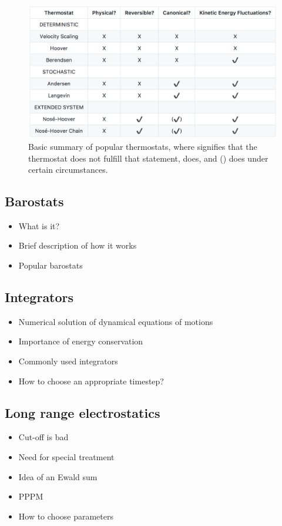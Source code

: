 \documentclass[9pt,bestpractices]{livecoms}
\begin{document}
\begin{figure}[h]
\centering
\includegraphics[width=\linewidth]{thermostat_summary.pdf}
    \caption{Basic summary of popular thermostats, where  signifies
    that the thermostat does not fulfill that statement,  does, and
    () does under certain circumstances.}
\label{tstat_summary}
\end{figure}

\subsection{Barostats}
\begin{itemize}
\item What is it?
\item Brief description of how it works
\item Popular barostats
\end{itemize}

\subsection{Integrators}
\begin{itemize}
\item Numerical solution of dynamical equations of motions
\item Importance of energy conservation
\item Commonly used integrators
\item How to choose an appropriate timestep?
\end{itemize}

\subsection{Long range electrostatics}
\begin{itemize}
\item Cut-off is bad
\item Need for special treatment
\item Idea of an Ewald sum
\item PPPM
\item How to choose parameters
\end{itemize}
\end{document}
